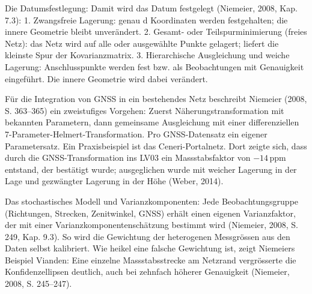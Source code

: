 Die Datumsfestlegung: Damit wird das Datum festgelegt (Niemeier, 2008, Kap. 7.3):
1. Zwangsfreie Lagerung: genau d Koordinaten werden festgehalten; die innere Geometrie bleibt unverändert.
2. Gesamt- oder Teilspurminimierung (freies Netz): das Netz wird auf alle oder ausgewählte Punkte gelagert; liefert die kleinste Spur der Kovarianzmatrix.
3. Hierarchische Ausgleichung und weiche Lagerung: Anschlusspunkte werden fest bzw. als Beobachtungen mit Genauigkeit eingeführt. Die innere Geometrie wird dabei verändert. \bigskip 

Für die Integration von GNSS in ein bestehendes Netz beschreibt Niemeier (2008, S. 363–365) ein zweistufiges Vorgehen:
Zuerst Näherungstransformation mit bekannten Parametern, dann gemeinsame Ausgleichung mit einer differenziellen 7-Parameter-Helmert-Transformation.
Pro GNSS-Datensatz ein eigener Parametersatz.
Ein Praxisbeispiel ist das Ceneri-Portalnetz. Dort zeigte sich, dass durch die GNSS-Transformation ins LV03 ein Massstabsfaktor von $-14\,\mathrm{ppm}$ entstand, der bestätigt wurde; ausgeglichen wurde mit weicher Lagerung in der Lage und gezwängter Lagerung in der Höhe (Weber, 2014). \bigskip 

Das stochastisches Modell und Varianzkomponenten:
Jede Beobachtungsgruppe (Richtungen, Strecken, Zenitwinkel, GNSS) erhält einen eigenen Varianzfaktor, der mit einer Varianzkomponentenschätzung bestimmt wird (Niemeier, 2008, S. 249, Kap. 9.3). 
So wird die Gewichtung der heterogenen Messgrössen aus den Daten selbst kalibriert. 
Wie heikel eine falsche Gewichtung ist, zeigt Niemeiers Beispiel Vianden: Eine einzelne Massstabsstrecke am Netzrand vergrösserte die Konfidenzellipsen deutlich, auch bei zehnfach höherer Genauigkeit (Niemeier, 2008, S. 245–247).

